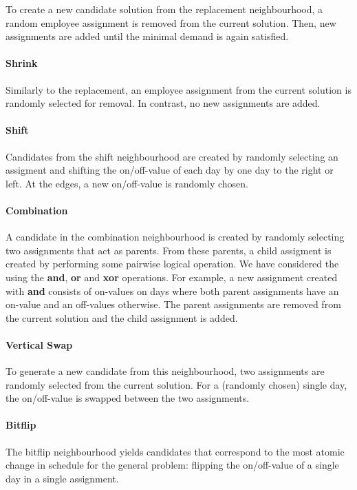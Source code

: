 \documentclass[]{article}
\begin{document}
To create a new candidate solution from the replacement neighbourhood, a random employee assignment is removed from the current solution. Then, new assignments are added until the minimal demand is again satisfied.

\paragraph{Shrink}

Similarly to the replacement, an employee assignment from the current solution is randomly selected for removal. In contrast, no new assignments are added.

\paragraph{Shift}

Candidates from the shift neighbourhood are created by randomly selecting an assigment and shifting the on/off-value of each day by one day to the right or left. At the edges, a new on/off-value is randomly chosen.

\paragraph{Combination}

A candidate in the combination neighbourhood is created by randomly selecting two assignments that act as parents. From these parents, a child assigment is created by performing some pairwise logical operation. We have considered the using the \textbf{and}, \textbf{or} and \textbf{xor} operations. For example, a new assignment created with \textbf{and} consists of on-values on days where both parent assignments have an on-value and an off-values otherwise. The parent assignments are removed from the current solution and the child assignment is added.

\paragraph{Vertical Swap}

To generate a new candidate from this neighbourhood, two assignments are randomly selected from the current solution. For a (randomly chosen) single day, the on/off-value is swapped between the two assignments.

\paragraph{Bitflip}
The bitflip neighbourhood yields candidates that correspond to the most atomic change in schedule for the general problem: flipping the on/off-value of a single day in a single assignment.
\end{document}

